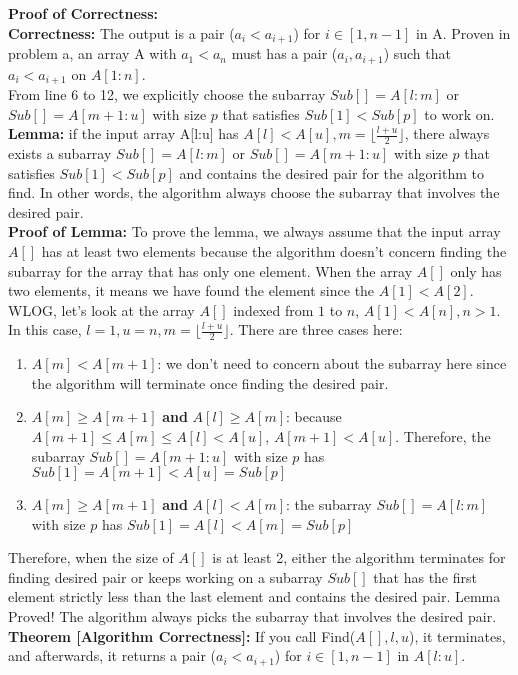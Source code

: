 \documentclass{article}
\begin{document}
\textbf{Proof of Correctness:}
\\\textbf{Correctness:} The output is a pair ($a_i<a_{i+1}$) for $i\in [1,n-1]$ in A. Proven in problem a, an array A with $a_1 < a_n$ must has a pair ($a_i,a_{i+1}$) such that $a_i<a_{i+1}$ on $A[1:n]$.
\\From line 6 to 12, we explicitly choose the subarray $Sub[] = A[l:m]$ or $Sub[]=A[m+1:u]$ with size $p$ that satisfies $Sub[1] < Sub[p]$ to work on.
\\\textbf{Lemma:} if the input array A[l:u] has $A[l] < A[u], m=\lfloor \frac{l+u}{2}\rfloor$, there always exists a subarray  $Sub[] = A[l:m]$ or $Sub[]=A[m+1:u]$ with size $p$ that satisfies $Sub[1] < Sub[p]$ and contains the desired pair for the algorithm to find. In other words, the algorithm always choose the subarray that involves the desired pair.
\\\textbf{Proof of Lemma:} To prove the lemma, we always assume that the input array $A[]$ has at least two elements because the algorithm doesn't concern finding the subarray for the array that has only one element. When the array $A[]$ only has two elements, it means we have found the element since the $A[1]<A[2]$. WLOG, let's look at the array $A[]$ indexed from $1$ to $n$, $A[1] < A[n], n>1$. In this case, $l = 1, u = n, m=\lfloor \frac{l+u}{2}\rfloor$. There are three cases here:
\begin{enumerate}
    \item $A[m] < A[m+1]$: we don't need to concern about the subarray here since the algorithm will terminate once finding the desired pair.
    \item $A[m] \geq A[m+1]$ \textbf{and} $A[l] \geq A[m]$: because $A[m+1] \leq A[m] \leq A[l] < A[u]$, $A[m+1] < A[u]$. Therefore, the subarray $Sub[] = A[m+1:u]$ with size $p$ has $Sub[1] = A[m+1] < A[u] = Sub[p]$
    \item $A[m] \geq A[m+1]$ \textbf{and} $A[l] < A[m]$: the subarray $Sub[]=A[l:m]$ with size $p$ has $Sub[1] = A[l] < A[m] = Sub[p]$
\end{enumerate}
Therefore, when the size of $A[]$ is at least 2, either the algorithm terminates for finding desired pair or keeps working on a subarray $Sub[]$ that has the first element strictly less than the last element and contains the desired pair. Lemma Proved! The algorithm always picks the subarray that involves the desired pair.
\\\textbf{Theorem [Algorithm Correctness]:} If you call Find($A[ ], l, u$), it terminates, and afterwards, it returns a pair ($a_i<a_{i+1}$) for $i\in [1,n-1]$ in $A[l:u]$.
\end{document}
